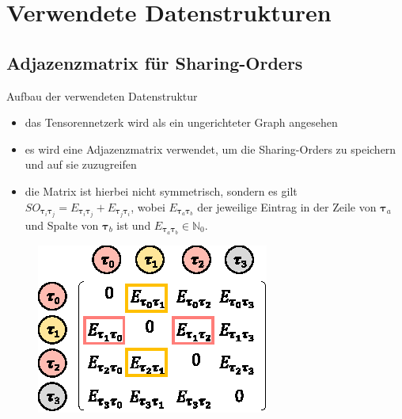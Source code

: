 \documentclass{beamer}
\begin{document}
\section{Verwendete Datenstrukturen}
\subsection{Adjazenzmatrix für Sharing-Orders}

\begin{frame}{Aufbau der verwendeten Datenstruktur}
	\begin{itemize}
		\item das Tensorennetzerk wird als ein ungerichteter Graph angesehen
		\item es wird eine Adjazenzmatrix verwendet, um die Sharing-Orders zu speichern und auf sie zuzugreifen
		\item die Matrix ist hierbei nicht symmetrisch,
		      sondern es gilt $SO_{\bm{\tau}_i \bm{\tau}_j} = E_{\bm{\tau}_i \bm{\tau}_j} + E_{\bm{\tau}_j \bm{\tau}_i}$, wobei $E_{\bm{\tau}_a \bm{\tau}_b}$ der jeweilige Eintrag in der Zeile von $\bm{\tau}_a$ und Spalte von $\bm{\tau}_b$ ist und $E_{\bm{\tau}_a \bm{\tau}_b} \in \mathbb{N}_0$.
	\end{itemize}
	\begin{figure}
		\includegraphics{figure_05_a}
	\end{figure}
\end{frame}
\end{document}
